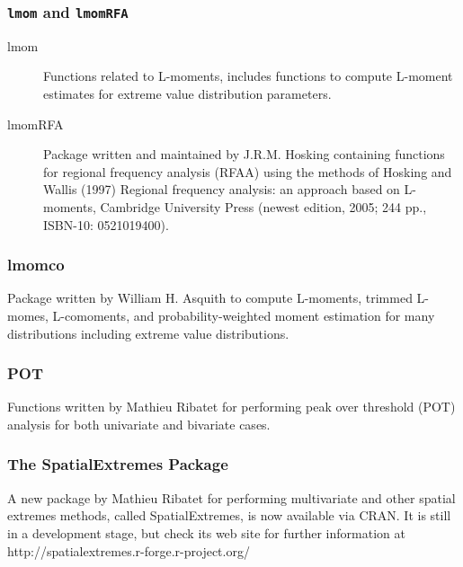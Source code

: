 \documentclass[MAIN.tex]{subfiles}
\begin{document}
\begin{frame}
	\frametitle{\texttt{lmom} and \texttt{lmomRFA}}
	\begin{description}
	\item[lmom]
	
	Functions related to L-moments, includes functions to compute L-moment estimates for extreme value distribution parameters.
	
	\item[lmomRFA]
	Package written and maintained by J.R.M. Hosking containing functions for regional frequency analysis (RFAA) using the methods of Hosking and Wallis (1997) Regional frequency analysis: an approach based on L-moments, Cambridge University Press (newest edition, 2005; 244 pp., ISBN-10: 0521019400).
\end{description}
\end{frame}
\begin{frame}
	\frametitle{lmomco}
	
	Package written by William H. Asquith to compute L-moments, trimmed L-momes, L-comoments, and probability-weighted moment estimation for many distributions including extreme value distributions.
	
\end{frame}
\begin{frame}
	\frametitle{POT}
	
	Functions written by Mathieu Ribatet for performing peak over threshold (POT) analysis for both univariate and bivariate cases.
	
\end{frame}
\begin{frame}
	\frametitle{The SpatialExtremes Package}
	
	A new package by Mathieu Ribatet for performing multivariate and other spatial extremes methods, called SpatialExtremes, is now available via CRAN. It is still in a development stage, but check its web site for further information at http://spatialextremes.r-forge.r-project.org/
	
\end{frame}
\end{document}
